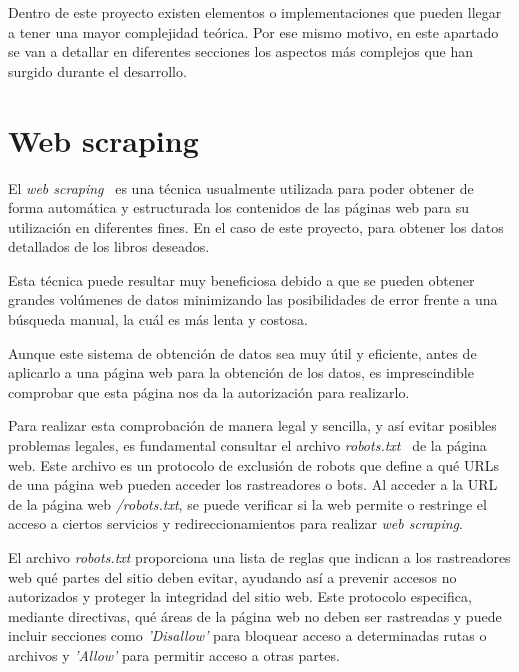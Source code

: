 
Dentro de este proyecto existen elementos o implementaciones que pueden llegar a tener una mayor complejidad teórica. Por ese mismo motivo, en este apartado se van a detallar en diferentes secciones los aspectos más complejos que han surgido durante el desarrollo.

\section{Web scraping}
El \textit{web scraping}~\cite{Webscraping} es una técnica usualmente utilizada para poder obtener de forma automática y estructurada los contenidos de las páginas web para su utilización en diferentes fines. 
En el caso de este proyecto, para obtener los datos detallados de los libros deseados.

Esta técnica puede resultar muy beneficiosa debido a que se pueden obtener grandes volúmenes de datos minimizando las posibilidades de error frente a una búsqueda manual, la cuál es más lenta y costosa.

Aunque este sistema de obtención de datos sea muy útil y eficiente, antes de aplicarlo a una página web para la obtención de los datos, es imprescindible comprobar que esta página nos da la autorización para realizarlo.

Para realizar esta comprobación de manera legal y sencilla, y así evitar posibles problemas legales, es fundamental consultar el archivo \textit{robots.txt}~\cite{Robots.txt} de la página web. Este archivo es un protocolo de exclusión de robots que define a qué URLs de una página web pueden acceder los rastreadores o bots. Al acceder a la URL de la página web \textit{/robots.txt}, se puede verificar si la web permite o restringe el acceso a ciertos servicios y redireccionamientos para realizar \textit{web scraping}.

El archivo \textit{robots.txt} proporciona una lista de reglas que indican a los rastreadores web qué partes del sitio deben evitar, ayudando así a prevenir accesos no autorizados y proteger la integridad del sitio web. Este protocolo especifica, mediante directivas, qué áreas de la página web no deben ser rastreadas y puede incluir secciones como \textit{'Disallow'} para bloquear acceso a determinadas rutas o archivos y \textit{'Allow'} para permitir acceso a otras partes.

